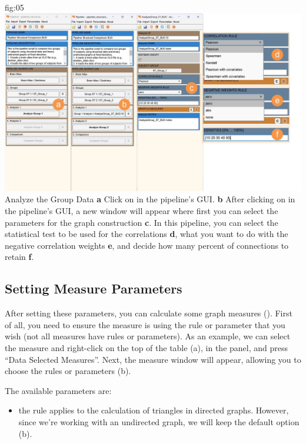 \documentclass[justified]{tufte-handout}
\begin{document}
	{fig:05}
	{
	\includegraphics{fig05.jpg}
	}
	{Analyze the Group Data}
	{
	{\bf a} Click on  in the pipeline's GUI.
        {\bf b} After clicking on  in the pipeline's GUI, a new window will appear where first you can select the parameters for the graph construction {\bf c}. In this pipeline, you can select the statistical test to be used for the correlations {\bf d}, what you want to do with the negative correlation weights {\bf e}, and decide how many percent of connections to retain {\bf f}.
	}

 
\subsection{Setting Measure Parameters}

 After setting these parameters, you can calculate some graph measures (). First of all, you need to ensure the measure is using the rule or parameter that you wish (not all measures have rules or parameters). As an example, we can select the measure  and right-click on the top of the table (a), in the  panel, and press “Data Selected Measures”. 
 Next, the measure window will appear, allowing you to choose the rules or parameters (b). 
 
 The available parameters are:
 \begin{itemize}
 	\item {} the rule applies to the calculation of triangles in directed graphs. However, since we're working with an undirected graph, we will keep the default option (b).
 \end{itemize}
 
\end{document}
